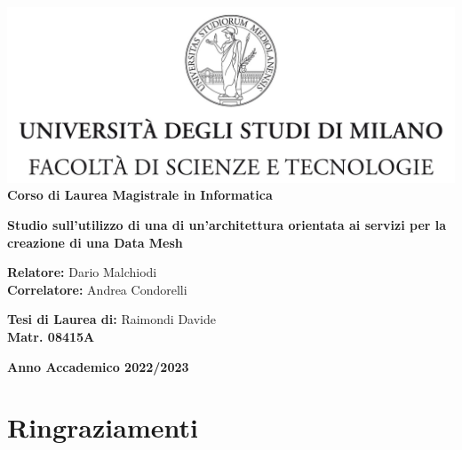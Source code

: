 \documentclass[12pt]{report}
\begin{document}
\begin{titlepage}
    \begin{center}
    \includegraphics[width=\textwidth]{immagini/tesiSCIENZE_TECNOLOGIE.jpg}\\
    {\large{\bf Corso di Laurea Magistrale in Informatica}}
    \end{center}
    \vspace{12mm}
    \begin{center}
    \vspace{4mm}
    {\huge{\bf Studio sull'utilizzo di una di un'architettura orientata ai servizi per la creazione di una Data Mesh}}\\
    \end{center}
    \vspace{4mm}
    \begin{flushleft}
    {\large{\bf Relatore:}}
    {\large{Dario Malchiodi}}\\
    \vspace{4mm}
    {\large{\bf Correlatore:}}
    {\large{Andrea Condorelli}}\\
    \end{flushleft}
    \vspace{12mm}
    \begin{flushright}
    {\large{\bf Tesi di Laurea di:}}
    {\large{Raimondi Davide}}\\
    {\large{\bf Matr. 08415A}}\\
    \end{flushright}
    \vspace{4mm}
    \begin{center}
    {\large{\bf Anno Accademico 2022/2023}}
    \end{center}
    \end{titlepage}
    
\onehalfspacing
\tableofcontents{}
\chapter*{Ringraziamenti}
\end{document}

